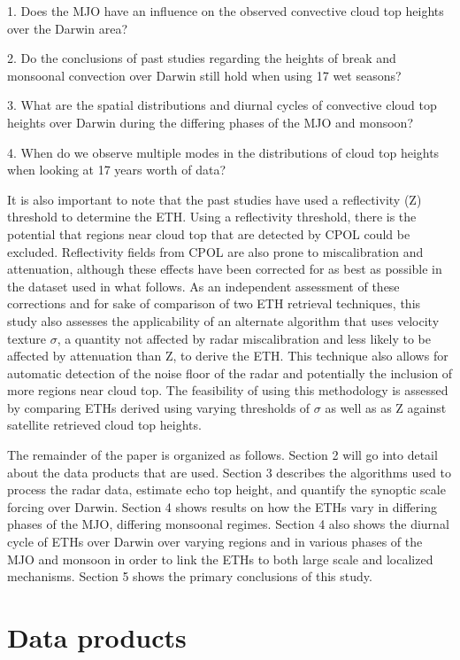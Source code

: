 \documentclass[journal abbreviation, manuscript]{copernicus}
\begin{document}
    1. Does the MJO have an influence on the observed convective cloud top heights over the Darwin area? 
    
    2. Do the conclusions of past studies regarding the heights of break and monsoonal convection over Darwin still hold when using 17 wet seasons?
    
    3. What are the spatial distributions and diurnal cycles of convective cloud top heights over Darwin during the differing phases of the MJO and monsoon?
    
    4. When do we observe multiple modes in the distributions of cloud top heights when looking at 17 years worth of data?
    
It is also important to note that the past studies have used a reflectivity (Z) threshold to determine the ETH. Using a reflectivity threshold, there is the potential that regions near cloud top that are detected by CPOL could be excluded. Reflectivity fields from CPOL are also prone to miscalibration and attenuation, although these effects have been corrected for as best as possible in the dataset used in what follows. As an independent assessment of these corrections and for sake of comparison of two ETH retrieval techniques, this study also assesses the applicability of an alternate algorithm that uses velocity texture $\sigma$, a quantity not affected by radar miscalibration and less likely to be affected by attenuation than Z, to derive the ETH. This technique also allows for automatic detection of the noise floor of the radar and potentially the inclusion of more regions near cloud top. The feasibility of using this methodology is assessed by comparing ETHs derived using varying thresholds of $\sigma$ as well as as Z against satellite retrieved cloud top heights. 
	
    The remainder of the paper is organized as follows. Section 2 will go into detail about the data products that are used. Section 3 describes the algorithms used to process the radar data, estimate echo top height, and quantify the synoptic scale forcing over Darwin. Section 4 shows results on how the ETHs vary in differing phases of the MJO, differing monsoonal regimes. Section 4 also shows the diurnal cycle of ETHs over Darwin over varying regions and in various phases of the MJO and monsoon in order to link the ETHs to both large scale and localized mechanisms. Section 5 shows the primary conclusions of this study. 
    
\section{Data products}
\end{document}
